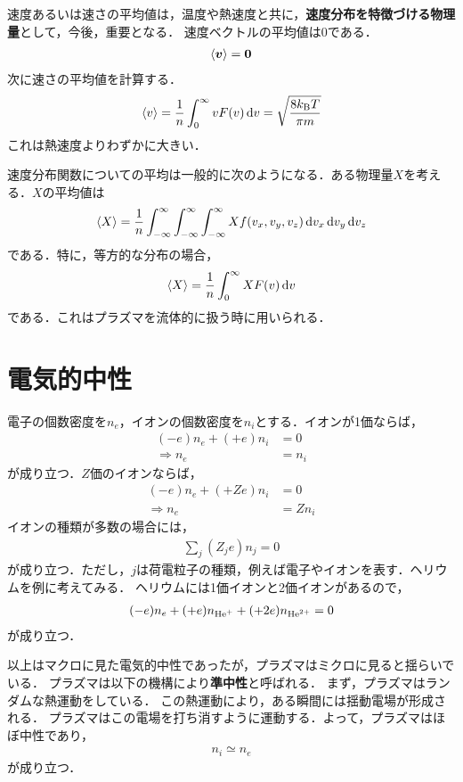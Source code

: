 \documentclass{report}
\begin{document}
    \par
    速度あるいは速さの平均値は，温度や熱速度と共に，\textbf{速度分布を特徴づける物理量}として，今後，重要となる．
    速度ベクトルの平均値は0である．
    \begin{align}
      \ev{\bm{v}} = \bm{0}
    \end{align}
    次に速さの平均値を計算する．
    \begin{align}
      \ev{v} = \frac{1}{n}\int_{0}^{\infty} v F(v) \dd{v} = \sqrt{\frac{8 \kb T}{\pi m}}
    \end{align}
    これは熱速度よりわずかに大きい．
    \par
    速度分布関数についての平均は一般的に次のようになる．ある物理量$X$を考える．$X$の平均値は
    \begin{align}
      \ev{X} = \frac{1}{n}\int_{-\infty}^{\infty} \int_{-\infty}^{\infty} \int_{-\infty}^{\infty} Xf(v_x, v_y, v_z) \dd{v_x}\dd{v_y}\dd{v_z}
    \end{align}
    である．特に，等方的な分布の場合，
    \begin{align}
      \ev{X} = \frac{1}{n} \int_{0}^{\infty} XF(v) \dd{v}
    \end{align}
    である．これはプラズマを流体的に扱う時に用いられる．
  \section{電気的中性}
    電子の個数密度を$n_e$，イオンの個数密度を$n_i$とする．イオンが1価ならば，
    \begin{align}
      (-e)n_e + (+e)n_i &= 0\\
      \Rightarrow n_e &= n_i
    \end{align}
    が成り立つ．$Z$価のイオンならば，
    \begin{align}
      (-e)n_e + (+Ze)n_i &= 0\\
      \Rightarrow n_e &= Zn_i
    \end{align}
    イオンの種類が多数の場合には，
    \begin{align}
      \sum_{j} (Z_j e)n_j = 0
    \end{align}
    が成り立つ．ただし，$j$は荷電粒子の種類，例えば電子やイオンを表す．ヘリウムを例に考えてみる．
    ヘリウムには1価イオンと2価イオンがあるので，
    \begin{align}
      (-e)n_e + (+e)n_{\mathrm{He}^{+}} + (+2e)n_{\mathrm{He}^{2+}} = 0
    \end{align}
    が成り立つ．
    \par
    以上はマクロに見た電気的中性であったが，プラズマはミクロに見ると揺らいでいる．
    プラズマは以下の機構により\textbf{準中性}と呼ばれる．
    まず，プラズマはランダムな熱運動をしている．
    この熱運動により，ある瞬間には揺動電場が形成される．
    プラズマはこの電場を打ち消すように運動する．よって，プラズマはほぼ中性であり，
    \begin{align}
      n_i \simeq n_e
    \end{align}
    が成り立つ．
\end{document}
